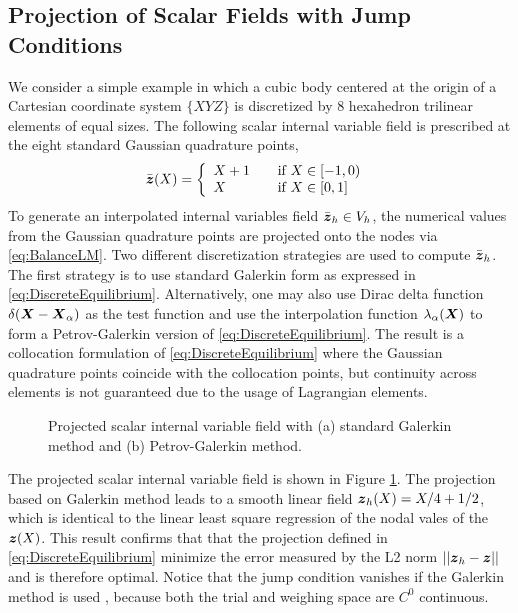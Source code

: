 \documentclass[12pt]{article}
\begin{document}
\subsection{Projection of Scalar Fields with Jump Conditions}
We consider a simple example in which a cubic body centered at the
origin of a Cartesian coordinate system $\{XYZ\}$ is discretized by 8
hexahedron trilinear elements of equal sizes. The following scalar
internal variable field is prescribed at the eight standard Gaussian
quadrature points,
\begin{equation}
\bar{{\boldsymbol{z}}}(X) = \left\{
  \begin{array}{l l}
    X + 1 & \quad \text{if $X \in [-1, 0)$ }\\
     X & \quad \text{if $X \in [0, 1]$ }\\
  \end{array} \right.
  \label{eq:PrescribedScalar}
\end{equation}
To generate an interpolated internal variables field $\bar{{\boldsymbol{z}}}_{h}
\in V_{h}$, the numerical values from the Gaussian quadrature points
are projected onto the nodes via \eqref{eq:BalanceLM}. Two different
discretization strategies are used to compute $\bar{{\boldsymbol{z}}}_{h}$. The
first strategy is to use standard Galerkin form as expressed in
\eqref{eq:DiscreteEquilibrium}. Alternatively, one may also use Dirac
delta function $\delta({\boldsymbol{X}} - {\boldsymbol{X}}_{\alpha})$ as the test function and
use the interpolation function $\lambda_{\alpha}({\boldsymbol{X}})$ to form a
Petrov-Galerkin version of \eqref{eq:DiscreteEquilibrium}. The result
is a collocation formulation of \eqref{eq:DiscreteEquilibrium} where
the Gaussian quadrature points coincide with the collocation points,
but continuity across elements is not guaranteed due to the usage of
Lagrangian elements.
\begin{figure}[htbp]
  \begin{center}
    \unitlength=1.0mm
    \caption{Projected scalar internal variable field with (a) standard
      Galerkin method and (b) Petrov-Galerkin method.}
    \label{fig:ExampleCube}
  \end{center}
\end{figure}

The projected scalar internal variable field is shown in Figure
\ref{fig:ExampleCube}. The projection based on Galerkin method leads
to a smooth linear field ${\boldsymbol{z}}_{h}(X) = X/4 + 1/2$, which is identical
to the linear least square regression of the nodal vales of the
${\boldsymbol{z}}(X)$. This result confirms that that the projection defined in
\eqref{eq:DiscreteEquilibrium} minimize the error measured by the L2
norm $||{\boldsymbol{z}}_{h} - {\boldsymbol{z}} ||$ and is therefore optimal. Notice that the
jump condition vanishes if the Galerkin method is used , because both
the trial and weighing space are $C^{0}$ continuous.
 
\end{document}

